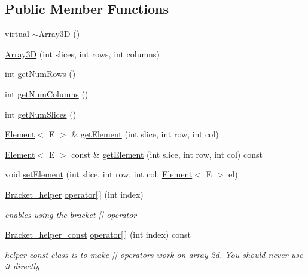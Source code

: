\subsection*{Public Member Functions}
\begin{DoxyCompactItemize}
\item 
virtual \hyperlink{classbridges_1_1datastructure_1_1_array3_d_afad3212fe6c2954859a7ea6dce7a739c}{$\sim$\+Array3D} ()
\item 
\hyperlink{classbridges_1_1datastructure_1_1_array3_d_af2d55bb9cf9057b9d5af4a24c6dc3173}{Array3D} (int slices, int rows, int columns)
\item 
int \hyperlink{classbridges_1_1datastructure_1_1_array3_d_a73aebe1098512ca4196cb8da0eb493fe}{get\+Num\+Rows} ()
\item 
int \hyperlink{classbridges_1_1datastructure_1_1_array3_d_acbd00c0c4448ff7ff03c76bc0701f602}{get\+Num\+Columns} ()
\item 
int \hyperlink{classbridges_1_1datastructure_1_1_array3_d_ad2fb0a0b8be702944c25b6fc807263f7}{get\+Num\+Slices} ()
\item 
\hyperlink{classbridges_1_1datastructure_1_1_element}{Element}$<$ E $>$ \& \hyperlink{classbridges_1_1datastructure_1_1_array3_d_a1e4a2bea4f3a292289cfc0a4d530108f}{get\+Element} (int slice, int row, int col)
\item 
\hyperlink{classbridges_1_1datastructure_1_1_element}{Element}$<$ E $>$ const  \& \hyperlink{classbridges_1_1datastructure_1_1_array3_d_a8f9d33a89196ef13839f30334b25476d}{get\+Element} (int slice, int row, int col) const
\item 
void \hyperlink{classbridges_1_1datastructure_1_1_array3_d_aaad4c68544d51cade79f318230ab2bcf}{set\+Element} (int slice, int row, int col, \hyperlink{classbridges_1_1datastructure_1_1_element}{Element}$<$ E $>$ el)
\item 
\hyperlink{structbridges_1_1datastructure_1_1_array3_d_1_1_bracket__helper}{Bracket\+\_\+helper} \hyperlink{classbridges_1_1datastructure_1_1_array3_d_a0b285b00e5d152d2968bee6b3aaf9349}{operator\mbox{[}$\,$\mbox{]}} (int index)
\begin{DoxyCompactList}\small\item\em enables using the bracket \mbox{[}\mbox{]} operator \end{DoxyCompactList}\item 
\hyperlink{structbridges_1_1datastructure_1_1_array3_d_1_1_bracket__helper__const}{Bracket\+\_\+helper\+\_\+const} \hyperlink{classbridges_1_1datastructure_1_1_array3_d_acfc0446c919e7ca70cc31d0624b3bcd1}{operator\mbox{[}$\,$\mbox{]}} (int index) const
\begin{DoxyCompactList}\small\item\em helper const class is to make \mbox{[}\mbox{]} operators work on array 2d. You should never use it directly \end{DoxyCompactList}\end{DoxyCompactItemize}

